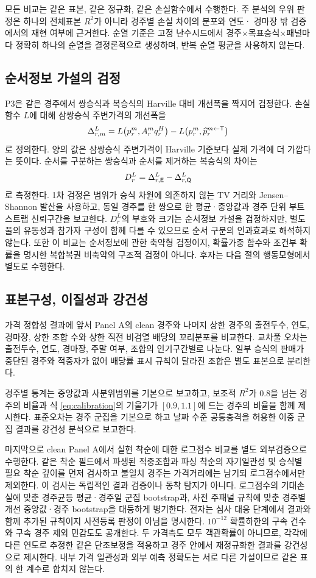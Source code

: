 모든 비교는 같은 표본, 같은 정규화, 같은 손실함수에서 수행한다. 주 분석의
우위 판정은 하나의 전체표본 $R^2$가 아니라 경주별 손실 차이의 분포와 연도·
경마장 밖 검증에서의 재현 여부에 근거한다.
순열 기준은 고정 난수시드에서 경주×목표승식×패널마다 정확히 하나의 순열을
결정론적으로 생성하며, 반복 순열 평균을 사용하지 않는다.

\subsection{순서정보 가설의 검정}

P3은 같은 경주에서 쌍승식과 복승식의 Harville 대비 개선폭을 짝지어 검정한다.
손실함수 $L$에 대해 삼쌍승식 주변가격의 개선폭을
\[
  \Delta^L_{r,m}
  =L\!\left(p^m_r,A^m_rq^H_r\right)
   -L\!\left(p^m_r,\widehat p^{m\leftarrow\mathsf{T}}_r\right)
\]
로 정의한다. 양의 값은 삼쌍승식 주변가격이 Harville 기준보다 실제 가격에 더
가깝다는 뜻이다. 순서를 구분하는 쌍승식과 순서를 제거하는 복승식의 차이는
\[
  D^L_r=\Delta^L_{r,\mathsf{E}}-\Delta^L_{r,\mathsf{Q}}
\]
로 측정한다. 1차 검정은 범위가 승식 차원에 의존하지 않는 TV 거리와
Jensen--Shannon 발산을 사용하고, 동일 경주를 한 쌍으로 한 평균·중앙값과
경주 단위 부트스트랩 신뢰구간을 보고한다. $D^L_r$의 부호와 크기는 순서정보
가설을 검정하지만, 별도 풀의 유동성과 참가자 구성이 함께 다를 수 있으므로
순서 구분의 인과효과로 해석하지 않는다.
또한 이 비교는 순서정보에 관한 축약형 검정이지, 확률가중 함수와 조건부 확률을
명시한 복합복권 비축약의 구조적 검정이 아니다. 후자는 다음 절의 행동모형에서
별도로 수행한다.

\subsection{표본구성, 이질성과 강건성}

가격 정합성 결과에 앞서 Panel A의 clean 경주와 나머지 상한 경주의 출전두수,
연도, 경마장, 상한 조합 수와 상한 직전 비검열 배당의 꼬리분포를 비교한다.
교차풀 오차는 출전두수, 연도, 경마장, 주말 여부, 조합의 인기구간별로 나눈다.
일부 승식의 판매가 중단된 경주와 적중자가 없어 배당률 표시 규칙이 달라진
조합은 별도 표본으로 분리한다.

경주별 통계는 중앙값과 사분위범위를 기본으로 보고하고, 보조적 $R^2$가 0.8을
넘는 경주의 비율과 식 \eqref{eq:calibration}의 기울기가 $[0.9,1.1]$에 드는
경주의 비율을 함께 제시한다. 표준오차는 경주 군집을 기본으로 하고 날짜 수준
공통충격을 허용한 이중 군집 결과를 강건성 분석으로 보고한다.

마지막으로 clean Panel A에서 실현 착순에 대한 로그점수 비교를 별도 외부검증으로
수행한다. 같은 착순 필드에서 파생된 적중조합과 파싱 착순의 자기일관성 및
승식별 필요 착순 깊이를 먼저 검사하고 불일치 경주는 가격거리에는 남기되
로그점수에서만 제외한다. 이 검사는 독립적인 결과 검증이나 동착 탐지가 아니다. 로그점수의
기대손실에 맞춘 경주균등 평균·경주일 군집 bootstrap과, 사전 주패널 규칙에
맞춘 경주별 개선 중앙값·경주 bootstrap을 대등하게 병기한다. 전자는 심사 대응
단계에서 결과와 함께 추가된 규칙이지 사전등록 판정이 아님을 명시한다.
$10^{-12}$ 확률하한의 구속 건수와 구속 경주 제외 민감도도 공개한다. 두 가격측도
모두 객관확률이 아니므로, 각각에 다른 연도로 추정한 같은 단조보정을 적용하고
경주 안에서 재정규화한 결과를 강건성으로 제시한다. 내부 가격 일관성과 외부
예측 정확도는 서로 다른 가설이므로 같은 표의 한 계수로 합치지 않는다.

